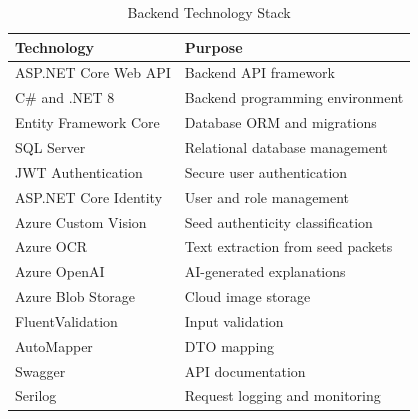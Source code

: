 \begin{table}[H]
\centering
\caption{Backend Technology Stack}
\label{tab:backend-tech-stack}
\renewcommand{\arraystretch}{1.3}

\begin{tabularx}{0.95\textwidth}{|p{4cm}|X|}
\hline
\textbf{Technology} & \textbf{Purpose} \\
\hline

ASP.NET Core Web API & Backend API framework \\

\hline

C\# and .NET 8 & Backend programming environment \\

\hline

Entity Framework Core & Database ORM and migrations \\

\hline

SQL Server & Relational database management \\

\hline

JWT Authentication & Secure user authentication \\

\hline

ASP.NET Core Identity & User and role management \\

\hline

Azure Custom Vision & Seed authenticity classification \\

\hline

Azure OCR & Text extraction from seed packets \\

\hline

Azure OpenAI & AI-generated explanations \\

\hline

Azure Blob Storage & Cloud image storage \\

\hline

FluentValidation & Input validation \\

\hline

AutoMapper & DTO mapping \\

\hline

Swagger & API documentation \\

\hline

Serilog & Request logging and monitoring \\

\hline

\end{tabularx}

\end{table}

